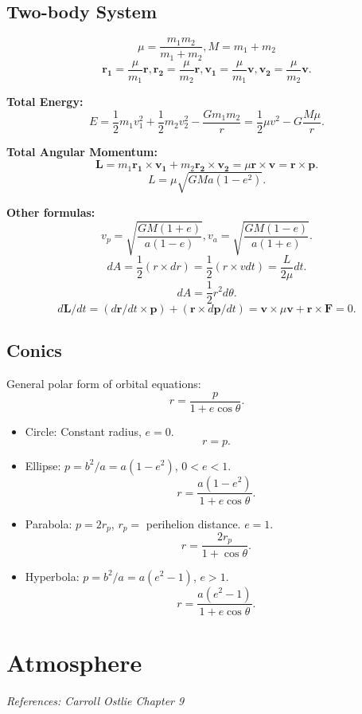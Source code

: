 \documentclass[12pt]{article}
\newcommand{\V}{

\vspace{\baselineskip}

}
\begin{document}
\subsection{Two-body System}

\[\mu = \frac{m_1m_2}{m_1 + m_2}, M = m_1+m_2\]
\[\mathbf{r_1} = \frac{\mu}{m_1}\mathbf{r}, \mathbf{r_2} = \frac{\mu}{m_2}\mathbf{r}, \mathbf{v_1} = \frac{\mu}{m_1}\mathbf{v}, \mathbf{v_2} = \frac{\mu}{m_2}\mathbf{v}.\]

\textbf{Total Energy:}
\[E = \frac{1}{2}m_1v_1^2 + \frac{1}{2}m_2v_2^2 - \frac{Gm_1m_2}{r} =  \frac{1}{2}\mu v^2 - G\frac{M\mu}{r}.\]

\textbf{Total Angular Momentum:}
\[\mathbf{L} = m_1\mathbf{r_1}\times \mathbf{v_1} + m_2\mathbf{r_2}\times\mathbf{v_2} = \mu \mathbf{r}\times \mathbf{v} = \mathbf{r}\times \mathbf{p}.\]
\[L = \mu\sqrt{GMa(1-e^2)}.\]

\textbf{Other formulas:}
\[v_p = \sqrt{\frac{GM(1+e)}{a(1-e)}}, v_a = \sqrt{\frac{GM(1-e)}{a(1+e)}}.\]
\[dA = \frac{1}{2}(r\times dr) = \frac{1}{2}(r\times vdt) = \frac{L}{2\mu}dt.\]
\[dA = \frac{1}{2}r^2d\theta.\]
\[d\mathbf{L}/dt = (d\mathbf{r}/dt\times \mathbf{p}) + (\mathbf{r}\times d\mathbf{p}/dt) = \mathbf{v}\times \mu \mathbf{v} + \mathbf{r}\times \mathbf{F} = 0.\]

\subsection{Conics}

General polar form of orbital equations: 
\[r = \frac{p}{1 + e\cos{\theta}}.\]

\begin{itemize}
    \item Circle: Constant radius, $e=0$.
    \[r = p.\]
    \item Ellipse: $p = b^2/a = a(1-e^2)$, $0 < e < 1$.
    \[r = \frac{a(1-e^2)}{1 + e\cos{\theta}}.\]
    \item Parabola: $p = 2r_p$, $r_p=$ perihelion distance. $e=1$.
    \[r = \frac{2r_p}{1+\cos{\theta}}.\]
    \item Hyperbola: $p = b^2/a = a(e^2-1)$, $e > 1$. 
    \[r = \frac{a(e^2-1)}{1+e\cos{\theta}}.\]
\end{itemize}

\newpage
\section{Atmosphere}

\textit{References: Carroll Ostlie Chapter 9}\V
\end{document}
